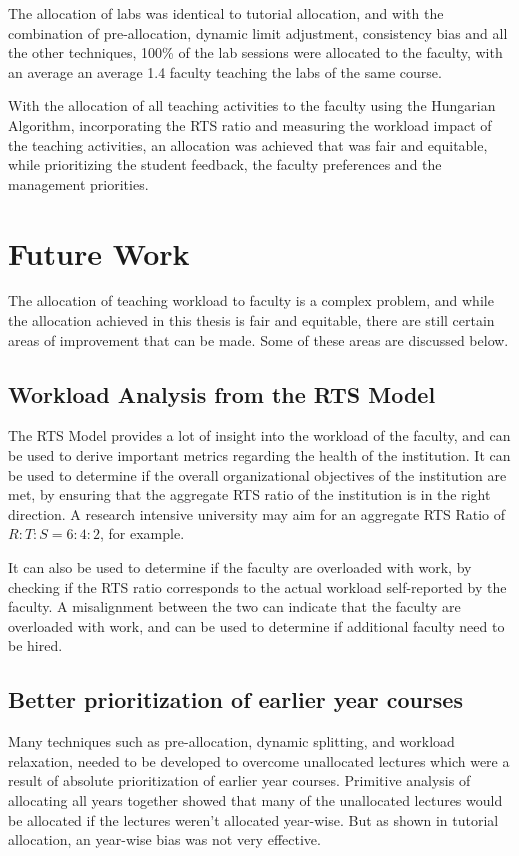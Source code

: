 The allocation of labs was identical to tutorial allocation, and with the combination of pre-allocation, dynamic limit adjustment, consistency bias and all the other techniques, 100\% of the lab sessions were allocated to the faculty, with an average an average 1.4 faculty teaching the labs of the same course.

With the allocation of all teaching activities to the faculty using the Hungarian Algorithm, incorporating the RTS ratio and measuring the workload impact of the teaching activities, an allocation was achieved that was fair and equitable, while prioritizing the student feedback, the faculty preferences and the management priorities.

\section{Future Work}

The allocation of teaching workload to faculty is a complex problem, and while the allocation achieved in this thesis is fair and equitable, there are still certain areas of improvement that can be made. Some of these areas are discussed below.

\subsection{Workload Analysis from the RTS Model}

The RTS Model provides a lot of insight into the workload of the faculty, and can be used to derive important metrics regarding the health of the institution. It can be used to determine if the overall organizational objectives of the institution are met, by ensuring that the aggregate RTS ratio of the institution is in the right direction. A research intensive university may aim for an aggregate RTS Ratio of $R:T:S = 6:4:2$, for example.

It can also be used to determine if the faculty are overloaded with work, by checking if the RTS ratio corresponds to the actual workload self-reported by the faculty. A misalignment between the two can indicate that the faculty are overloaded with work, and can be used to determine if additional faculty need to be hired.

\subsection{Better prioritization of earlier year courses}

Many techniques such as pre-allocation, dynamic splitting, and workload relaxation, needed to be developed to overcome unallocated lectures which were a result of absolute prioritization of earlier year courses. Primitive analysis of allocating all years together showed that many of the unallocated lectures would be allocated if the lectures weren't allocated year-wise. But as shown in tutorial allocation, an year-wise bias was not very effective.

